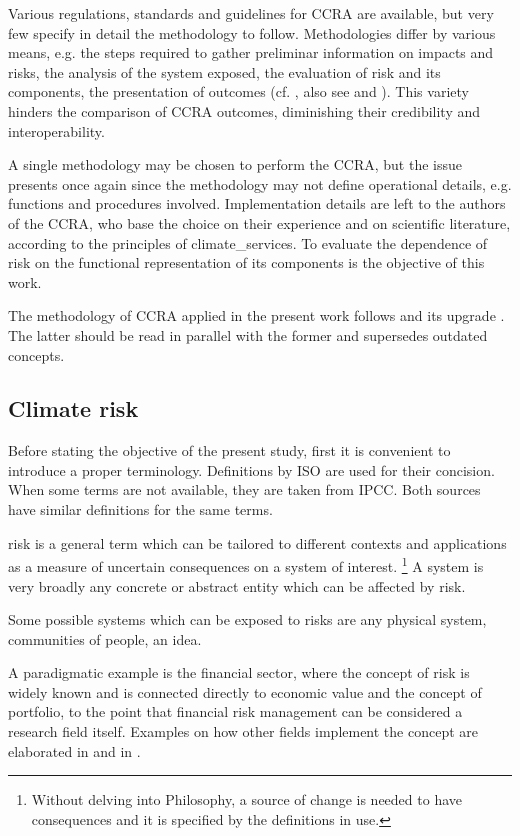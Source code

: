 Various regulations, standards and guidelines for \gls{CCRA} are available, but very few specify in detail the methodology to follow.\cite{2024LoyerInventoryOf} Methodologies differ by various means, e.g. the steps required to gather preliminar information on impacts and risks, the analysis of the system exposed, the evaluation of risk and its components, the presentation of outcomes (cf. \cite{2021ISO14091,2024EEAExecutiveSummary,2017GIZTheVulnerability,2014BowyerAdaptingTo,2024EU20212139}, also see \cite[10-11]{2024LoyerInventoryOf} and \cite[9]{2017GIZRiskSupplement}). This variety hinders the comparison of \gls{CCRA} outcomes, diminishing their credibility and interoperability.\cite{2022HainLetsGet}

A single methodology may be chosen to perform the \gls{CCRA}, but the issue presents once again since the methodology may not define operational details, e.g. functions and procedures involved. Implementation details are left to the authors of the \gls{CCRA}, who base the choice on their experience and on scientific literature, according to the principles of \glspl{climate_service}.
To evaluate the dependence of \gls{risk} on the functional representation of its components is the objective of this work.

The methodology of \gls{CCRA} applied in the present work follows \cite{2017GIZTheVulnerability} and its upgrade \cite{2017GIZRiskSupplement}. The latter should be read in parallel with the former and supersedes outdated concepts.



\subsection{Climate risk}
\label{sec:Climate risk}
Before stating the objective of the present study, first it is convenient to introduce a proper terminology.
Definitions by \gls{ISO} are used for their concision. When some terms are not available, they are taken from \gls{IPCC}. Both sources have similar definitions for the same terms.

\Gls{risk} is a general term which can be tailored to different contexts and applications as a measure of uncertain consequences on a system of interest.%
\footnote{Without delving into Philosophy, a source of change is needed to have consequences and it is specified by the definitions in use.}
A system is very broadly any concrete or abstract entity which can be affected by \gls{risk}.
\begin{example}
  Some possible systems which can be exposed to \glspl{risk} are any physical system, communities of people, an idea.
\end{example}
A paradigmatic example is the financial sector, where the concept of \gls{risk} is widely known and is connected directly to economic value and the concept of portfolio, to the point that financial risk management can be considered a research field itself.\cite{2004ChristoffersenElementsOf}
Examples on how other fields implement the concept are elaborated in \cite[14]{2017GIZRiskSupplement} and in \cite{2020ReisingerTheConcept}.

